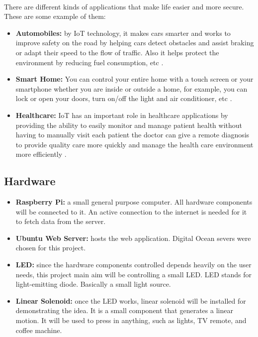 \documentclass[12pt, oneside, a4paper]{book}
\newcommand\boldcolor[1]{\textcolor{bold}{\textbf{#1}}}
\begin{document}
			\paragraph{}There are different kinds of applications that make life easier and more secure. These are some example of them:
			\begin{itemize}
			\item \boldcolor{Automobiles:}  by IoT technology, it makes cars smarter and works to improve safety on the road by helping cars detect obstacles and assist braking or adapt their speed to the flow of traffic. Also it helps protect the environment by reducing fuel consumption, etc \cite{iot_7}.
			\item \boldcolor{Smart Home:}  You can control your entire home with a touch screen or your smartphone whether you are inside or outside a home, for example, you can lock or open your doors, turn on/off the light and air conditioner, etc \cite{iot_8}.
			\item \boldcolor{Healthcare:} IoT has an important role in healthcare applications by providing the ability to easily monitor and manage patient health without having to manually visit each patient the doctor can give a remote diagnosis to provide quality care more quickly and manage the health care environment more efficiently \cite{iot_5}.
			\end{itemize}
			\subsection{Hardware}
				\begin{itemize}
				\item \boldcolor{Raspberry Pi:} a small general purpose computer. All hardware components will be connected to it. An active connection to the internet is needed for it to fetch data from the server\cite{raspberry}. %
				\item \boldcolor{Ubuntu Web Server:} hosts the web application. Digital Ocean severs\cite{digital_ocean} were chosen for this project.
				
				\item \boldcolor{LED:} since the hardware components controlled depends heavily on the user needs, this project main aim will be controlling a small LED. LED stands for light-emitting diode\cite{led}. Basically a small light source. %
				\item \boldcolor{Linear Solenoid:} once the LED works, linear solenoid will be installed for demonstrating the idea\cite{linear}. It is a small component that generates a linear motion. It will be used to press in anything, such as lights, TV remote, and coffee machine. %
				\end{itemize}
				
\end{document}
